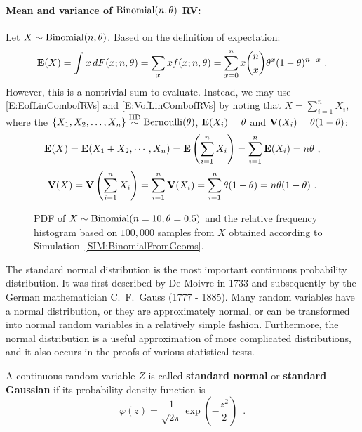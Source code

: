 \paragraph{Mean and variance of $\mbox{{\rm Binomial}}(n,\theta)$ RV:}
Let $X \sim \mbox{{\rm Binomial}}(n,\theta)$.  Based on the definition of expectation:
\[
\e(X) = \int x \, dF(x; n,\theta) = \sum_x x f(x;n,\theta) = \sum_{x =0}^n x \binom{n}{x} \theta^x (1-\theta)^{n-x} \ .
\]
However, this is a nontrivial sum to evaluate.  Instead, we may use \eqref{E:EofLinCombofRVs} and \eqref{E:VofLinCombofRVs} by noting that $X = \sum_{i=1}^n X_i$, where the $\{X_1,X_2,\ldots,X_n \} \overset{{\rm IID}}{\sim} \mbox{{\rm Bernoulli}}(\theta)$, $\mathbf{E}(X_i) = \theta$ and $\mathbf{V}(X_i)=\theta(1-\theta)$:
\[
\mathbf{E}(X) = \mathbf{E}(X_1+X_2, \cdots ,X_n) = \mathbf{E} \left( \sum_{i=1}^n X_i \right) = \sum_{i=1}^n \mathbf{E}(X_i) = n \theta \ ,
\]
\[
\mathbf{V}(X) = \mathbf{V} \left( \sum_{i=1}^n X_i \right) = \sum_{i=1}^n \mathbf{V}(X_i) = \sum_{i=1}^n{\theta(1-\theta)} = n\theta(1-\theta) \ .
\]

\begin{figure}[htpb]
\caption{PDF of $X \sim \mbox{{\rm Binomial}}(n=10,\theta=0.5)$ and the relative frequency histogram based on $100,000$ samples from $X$ obtained according to Simulation~\ref{SIM:BinomialFromGeoms}.\label{F:PlotPdfSim10000HistBinomByGeomsn10thetaHalf}} %
\centering   {}
\end{figure}

The standard normal distribution is the most important continuous
probability distribution. It was first described by De Moivre in 1733
and subsequently by the German mathematician C.~F.~Gauss (1777 - 1885).
Many  random variables  have a normal distribution, or they are
approximately normal, or can be transformed into normal random variables
in a relatively simple fashion. Furthermore, the normal distribution is
a useful approximation of more complicated distributions, and it also
occurs in the proofs of various statistical tests.

\begin{framed}
\begin{model}\label{Df:StandardNormal} 
A continuous random variable $Z$ is called \textbf{standard normal} or {\bf standard Gaussian} 
if its probability density function is
\begin{equation}\label{E:StandardNormalPdf}
\varphi(z) = \frac{1}{\sqrt{2\pi}} \exp{\left( -\frac{z^2}{2}\right)} \enspace.
\end{equation}
\end{model}
\end{framed}

